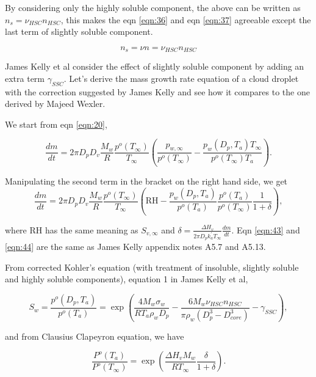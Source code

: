 \documentclass[12pt]{amsart}
\begin{document}
By considering only the highly soluble component, the above can be written as $n_{s}=\nu_{HSC} n_{HSC}$, this makes the eqn \ref{eqn:36} and eqn \ref{eqn:37} agreeable except the last term of slightly soluble component. 

\begin{equation}\label{eqn:42}
n_{s}=\nu n=\nu_{HSC} n_{HSC}
\end{equation}

James Kelly et al consider the effect of slightly soluble component by adding an extra term $\gamma_{SSC}$.  Let's derive the mass growth rate equation of a cloud droplet with the correction suggested by James Kelly and see how it compares to the one derived by Majeed Wexler.

We start from eqn \ref{eqn:20}, 

\begin{equation}\label{eqn:43}
\frac{dm}{dt}=2 \pi D_{p} D_{v} \frac{M_{w}}{R}  \frac{p^{o}(T_{\infty})} {T_{\infty}} (\frac{p_{w, \infty}}{p^{o}(T_{\infty})} - \frac{p_{w}(D_{p}, T_{a}) T_{\infty}}{p^{o}(T_{\infty}) T_{a}}).
\end{equation}

Manipulating the second term in the bracket on the right hand side, we get
\begin{equation}\label{eqn:44}
\frac{dm}{dt}=2 \pi D_{p} D_{v}  \frac{M_{w}}{R} \frac{p^{o}(T_{\infty})} {T_{\infty}} (\textrm{RH} - \frac{p_{w}(D_{p}, T_{a})}{p^{o}(T_{a})} \frac{p^{o}(T_{a})}{p^{o}(T_{\infty})}\frac{1}{1+\delta}),
\end{equation}

where RH has the same meaning as $S_{v, \infty}$ and $\delta=\frac{\Delta H_{v}}{2 \pi D_{p} k^{'}_{a} T_{\infty}} \frac{dm}{dt}$. Eqn \ref{eqn:43} and \ref{eqn:44} are the same as James Kelly appendix notes A5.7 and A5.13.

From corrected Kohler's  equation (with treatment of insoluble, slightly soluble and highly soluble components), equation 1  in James Kelly et al, 

\begin{equation}\label{eqn:45}
S_{w}=\frac{p^{o}(D_{p} ,T_{a})} {p^{o}(T_{a})} =\exp(\frac{4M_{w}\sigma_{w}}{RT_{a}\rho_{w}D_{p}}-\frac{6M_{w}\nu_{HSC}n_{HSC}}{\pi \rho_{w} (D_{p}^{3}-D_{core}^{3})}-\gamma_{SSC}),
\end{equation}

and from Clausius Clapeyron equation, we have

\begin{equation}\label{eqn:46}
\frac{P^{o}(T_{a})}{P^{o}(T_{\infty})}=\exp (\frac{\Delta H_{v} M_{w}}{R T_{\infty}} \frac{\delta}{1+\delta}).
\end{equation}
  
\end{document}
